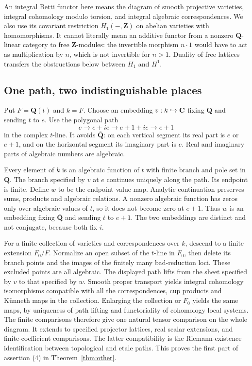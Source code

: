 \documentclass[11pt]{article}
\theoremstyle{definition}\newtheorem{definition}[theorem]{Definition}
\theoremstyle{remark}\newtheorem{remark}[theorem]{Remark}
\newcommand{\Q}{\mathbf Q}\newcommand{\Z}{\mathbf Z}
\newcommand{\Qb}{\overline{\mathbf Q}}\newcommand{\Fp}{\mathbf F_p}
\begin{document}
An integral Betti functor here means the diagram of smooth projective varieties, integral cohomology modulo torsion, and integral algebraic correspondences. We also use its covariant restriction $H_1(-,\Z)$ on abelian varieties with homomorphisms. It cannot literally mean an additive functor from a nonzero $\Q$-linear category to free $\Z$-modules: the invertible morphism $n\cdot1$ would have to act as multiplication by $n$, which is not invertible for $n>1$. Duality of free lattices transfers the obstructions below between $H_1$ and $H^1$.

\subsection{One path, two indistinguishable places}
Put $F=\Qb(t)$ and $k=\overline F$. Choose an embedding $v:k\hookrightarrow\mathbf C$ fixing $\Qb$ and sending $t$ to $e$. Use the polygonal path
\[
                e\longrightarrow e+ie\longrightarrow e+1+ie
                   \longrightarrow e+1
\]
in the complex $t$-line. It avoids $\Qb$: on each vertical segment its real part is $e$ or $e+1$, and on the horizontal segment its imaginary part is $e$. Real and imaginary parts of algebraic numbers are algebraic.

Every element of $k$ is an algebraic function of $t$ with finite branch and pole set in $\Qb$. The branch specified by $v$ at $e$ continues uniquely along the path. Its endpoint is finite. Define $w$ to be the endpoint-value map. Analytic continuation preserves sums, products and algebraic relations. A nonzero algebraic function has zeros only over algebraic values of $t$, so it does not become zero at $e+1$. Thus $w$ is an embedding fixing $\Qb$ and sending $t$ to $e+1$. The two embeddings are distinct and not conjugate, because both fix $i$.

For a finite collection of varieties and correspondences over $k$, descend to a finite extension $F_0/F$. Normalize an open subset of the $t$-line in $F_0$, then delete its branch points and the images of the finitely many bad-reduction loci. These excluded points are all algebraic. The displayed path lifts from the sheet specified by $v$ to that specified by $w$. Smooth proper transport yields integral cohomology isomorphisms compatible with all the correspondences, cup products and K\"unneth maps in the collection. Enlarging the collection or $F_0$ yields the same maps, by uniqueness of path lifting and functoriality of cohomology local systems. The finite comparisons therefore give one natural tensor comparison on the whole diagram. It extends to specified projector lattices, real scalar extensions, and finite-coefficient comparisons. The latter compatibility is the Riemann-existence identification between topological and etale paths. This proves the first part of assertion (4) in Theorem~\ref{thm:other}.
\end{document}
